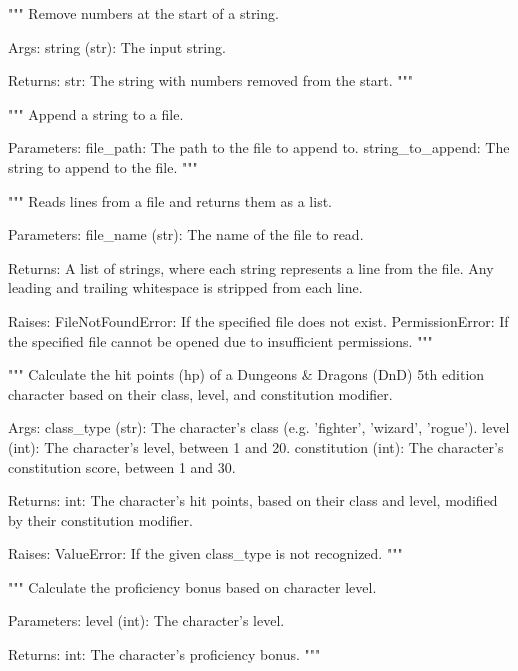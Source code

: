 \begin{codebox}
"""
Remove numbers at the start of a string.

Args:
    string (str): The input string.

Returns:
    str: The string with numbers removed from the start.
"""
\end{codebox}

\begin{codebox}
"""
Append a string to a file.

Parameters:
    file_path: The path to the file to append to.
    string_to_append: The string to append to the file.
"""
\end{codebox}

\begin{codebox}
"""
Reads lines from a file and returns them as a list.

Parameters:
    file_name (str): The name of the file to read.

Returns:
    A list of strings, where each string represents a line from the file.
    Any leading and trailing whitespace is stripped from each line.

Raises:
    FileNotFoundError: If the specified file does not exist.
    PermissionError: If the specified file cannot be opened due to insufficient permissions.
"""
\end{codebox}

\begin{codebox}
"""
Calculate the hit points (hp) of a Dungeons & Dragons (DnD) 5th edition character
based on their class, level, and constitution modifier.

Args:
    class_type (str): The character's class (e.g. 'fighter', 'wizard', 'rogue').
    level (int): The character's level, between 1 and 20.
    constitution (int): The character's constitution score, between 1 and 30.

Returns:
    int: The character's hit points, based on their class and level, modified by their
       constitution modifier.

Raises:
    ValueError: If the given class_type is not recognized.
"""
\end{codebox}

\begin{codebox}
"""
Calculate the proficiency bonus based on character level.

Parameters:
    level (int): The character's level.

Returns:
    int: The character's proficiency bonus.
"""
\end{codebox}

